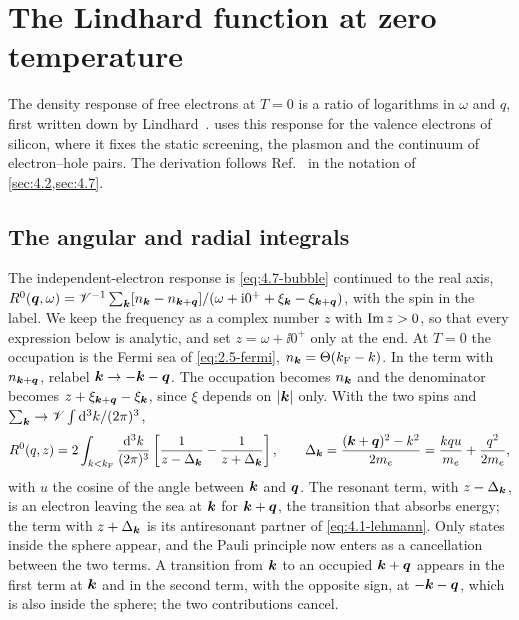\section{The Lindhard function at zero temperature}\label{app:D.8}

The density response of free electrons at $T = 0$ is a ratio of logarithms in $\omega$ and $q$, first written down by Lindhard~\cite{lindhard1954properties}.  uses this response for the valence electrons of silicon, where it fixes the static screening, the plasmon and the continuum of electron--hole pairs. The derivation follows Ref.~\cite[Chap.~4]{giuliani2005quantum} in the notation of \cref{sec:4.2,sec:4.7}.

\subsection*{The angular and radial integrals}

The independent-electron response is \cref{eq:4.7-bubble} continued to the real axis, $R^0(\bm{q},\omega) = \mathscr{V}^{-1}\sum_{\bm{k}}[n_{\bm{k}} - n_{\bm{k}+\bm{q}}]/(\omega + \mathrm{i}0^+ + \xi_{\bm{k}} - \xi_{\bm{k}+\bm{q}})$, with the spin in the label. We keep the frequency as a complex number $z$ with $\operatorname{Im} z > 0$, so that every expression below is analytic, and set $z = \omega + \ii0^+$ only at the end. At $T = 0$ the occupation is the Fermi sea of \cref{eq:2.5-fermi}, $n_{\bm{k}} = \Theta(k_{\mathrm{F}} - k)$. In the term with $n_{\bm{k}+\bm{q}}$, relabel $\bm{k} \to -\bm{k} - \bm{q}$. The occupation becomes $n_{\bm{k}}$ and the denominator becomes $z + \xi_{\bm{k}+\bm{q}} - \xi_{\bm{k}}$, since $\xi$ depends on $|\bm{k}|$ only. With the two spins and $\sum_{\bm{k}} \to \mathscr{V}\int\mathrm{d}^3k/(2\pi)^3$,
\begin{equation*}
  R^0(q,z) = 2\int_{k < k_{\mathrm{F}}}\frac{\mathrm{d}^3k}{(2\pi)^3}\left[\frac{1}{z - \Delta_{\bm{k}}} - \frac{1}{z + \Delta_{\bm{k}}}\right], \qquad
  \Delta_{\bm{k}} = \frac{(\bm{k} + \bm{q})^2 - k^2}{2m_e} = \frac{kqu}{m_e} + \frac{q^2}{2m_e} ,
\end{equation*}
with $u$ the cosine of the angle between $\bm{k}$ and $\bm{q}$. The resonant term, with $z - \Delta_{\bm{k}}$, is an electron leaving the sea at $\bm{k}$ for $\bm{k} + \bm{q}$, the transition that absorbs energy; the term with $z + \Delta_{\bm{k}}$ is its antiresonant partner of \cref{eq:4.1-lehmann}. Only states inside the sphere appear, and the Pauli principle now enters as a cancellation between the two terms. A transition from $\bm{k}$ to an occupied $\bm{k} + \bm{q}$ appears in the first term at $\bm{k}$ and in the second term, with the opposite sign, at $-\bm{k} - \bm{q}$, which is also inside the sphere; the two contributions cancel.

